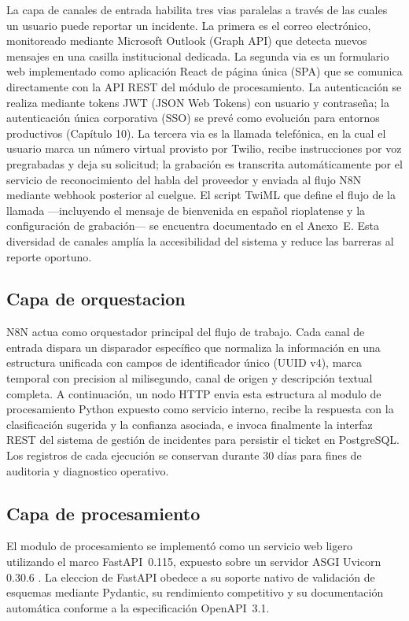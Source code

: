 La capa de canales de entrada habilita tres vias paralelas a través de las cuales un usuario puede reportar un incidente. La primera es el correo electrónico, monitoreado mediante Microsoft Outlook (Graph API) que detecta nuevos mensajes en una casilla institucional dedicada. La segunda via es un formulario web implementado como aplicación React de página única (SPA) que se comunica directamente con la API REST del módulo de procesamiento. La autenticación se realiza mediante tokens JWT (JSON Web Tokens) con usuario y contraseña; la autenticación única corporativa (SSO) se prevé como evolución para entornos productivos (Capítulo 10). La tercera via es la llamada telefónica, en la cual el usuario marca un número virtual provisto por Twilio, recibe instrucciones por voz pregrabadas y deja su solicitud; la grabación es transcrita automáticamente por el servicio de reconocimiento del habla del proveedor y enviada al flujo N8N mediante webhook posterior al cuelgue. El script TwiML que define el flujo de la llamada —incluyendo el mensaje de bienvenida en español rioplatense y la configuración de grabación— se encuentra documentado en el Anexo~E. Esta diversidad de canales amplía la accesibilidad del sistema y reduce las barreras al reporte oportuno.

\subsection{Capa de orquestacion}

N8N actua como orquestador principal del flujo de trabajo. Cada canal de entrada dispara un disparador específico que normaliza la información en una estructura unificada con campos de identificador único (UUID v4), marca temporal con precision al milisegundo, canal de origen y descripción textual completa. A continuación, un nodo HTTP envia esta estructura al modulo de procesamiento Python expuesto como servicio interno, recibe la respuesta con la clasificación sugerida y la confianza asociada, e invoca finalmente la interfaz REST del sistema de gestión de incidentes para persistir el ticket en PostgreSQL. Los registros de cada ejecución se conservan durante 30 días para fines de auditoria y diagnostico operativo.

\subsection{Capa de procesamiento}

El modulo de procesamiento se implementó como un servicio web ligero utilizando el marco FastAPI~0.115, expuesto sobre un servidor ASGI Uvicorn 0.30.6 \parencite{Tiangolo2024_fastapi}. La eleccion de FastAPI obedece a su soporte nativo de validación de esquemas mediante Pydantic, su rendimiento competitivo y su documentación automática conforme a la especificación OpenAPI~3.1.

